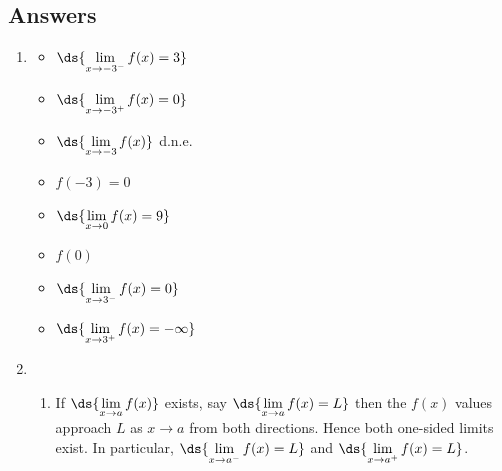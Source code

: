\documentclass{ximera}
\begin{document}
\newpage

\subsection{Answers}

\begin{enumerate}

\item  \begin{multicols}{4} \begin{itemize} \item $\ds{\lim_{x \rightarrow -3^{-}} f(x) = 3}$

\item $\ds{\lim_{x \rightarrow -3^{+}} f(x) = 0}$

\item $\ds{\lim_{x \rightarrow -3} f(x)}$ d.n.e.

\item $f(-3) = 0$

\end{itemize}

\end{multicols}

\bigskip

\begin{multicols}{4}

\begin{itemize}

\item $\ds{\lim_{x \rightarrow 0} f(x) = 9}$

\item  $f(0)$

\item $\ds{\lim_{x \rightarrow 3^{-}} f(x) = 0}$

\item $\ds{\lim_{x \rightarrow 3^{+}} f(x) = -\infty}$
\end{itemize}

\end{multicols}

\bigskip


\item  \begin{enumerate}  \item  If $\ds{\lim_{x \rightarrow a} f(x)}$ exists, say $\ds{\lim_{x \rightarrow a} f(x) = L}$ then the $f(x)$ values approach  $L$  as $x \rightarrow a$ from both directions.  Hence both one-sided limits exist.  In particular,  $\ds{\lim_{x \rightarrow a^{-}} f(x) = L}$ and $\ds{\lim_{x \rightarrow a^{+}} f(x) = L}$.


\end{enumerate}
\end{enumerate}
\end{document}
